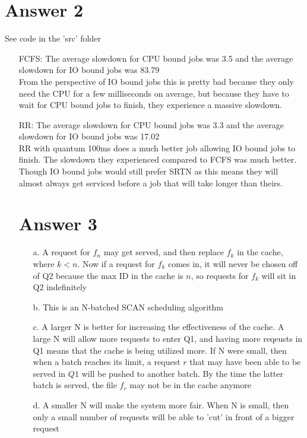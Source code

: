 \documentclass[11pt]{article}
\theoremstyle{definition}
\begin{document}
\section*{Answer 2}
See code in the 'src' folder
\begin{enumerate}
	\item[FCFS:] The average slowdown for CPU bound jobs was 3.5 and the average slowdown for IO bound jobs was 83.79\\
	From the perspective of IO bound jobs this is pretty bad because they only need the CPU for a few milliseconds on average, but because they have to wait
	for CPU bound jobs to finish, they experience a massive slowdown.
	
	\item[RR: ] The average slowdown for CPU bound jobs was 3.3 and the average slowdown for IO bound jobs was 17.02\\
	RR with quantum 100ms does a much better job allowing IO bound jobs to finish.  The slowdown they experienced compared to FCFS was much better.  Though IO bound jobs
	would still prefer SRTN as this means they will almost always get serviced before a job that will take longer than theirs.

\section*{Answer 3}
\begin{enumerate}
	\item[a.] A request for $f_n$ may get served, and then replace $f_k$ in the cache, where $k < n$.  Now if a request for $f_k$ comes in, it will never be chosen off of Q2
	because the max ID in the cache is $n$, so requests for $f_k$ will sit in Q2 indefinitely
	
	\item[b.] This is an N-batched SCAN scheduling algorithm
	
	\item[c.] A larger N is better for increasing the effectiveness of the cache.  A large N will allow more requests to enter Q1, and having more reqeusts in Q1 means that the cache
	is being utilized more.  If N were small, then when a batch reaches its limit, a request $r$ that may have been able to be served in $Q1$ will be pushed to another batch.  By the time the latter
	batch is served, the file $f_r$ may not be in the cache anymore
	
	\item[d.] A smaller N will make the system more fair.  When N is small, then only a small number of requests will be able to 'cut' in front of a bigger request
	

\end{enumerate}
\end{enumerate}
\end{document}
